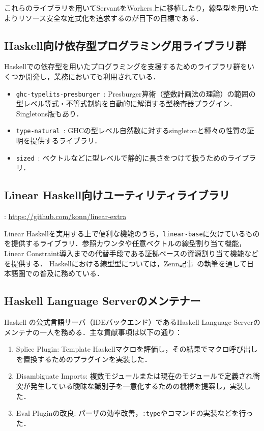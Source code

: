 \documentclass[a4j]{ltjsarticle}
\renewcommand{\emph}[1]{\textbf{\textgt{#1}}}
\begin{document}
\begin{refsection}
これらのライブラリを用いてServantをWorkers上に移植したり，線型型を用いたよりリソース安全な定式化を追求するのが目下の目標である．

\subsection*{Haskell向け依存型プログラミング用ライブラリ群}
Haskellでの依存型を用いたプログラミングを支援するためのライブラリ群をいくつか開発し，業務においても利用されている．

\begin{itemize}
  \item \texttt{ghc-typelits-presburger}~\cite{ghc-typelits-presburger}: Presburger算術（整数計画法の理論）の範囲の型レベル等式・不等式制約を自動的に解消する型検査器プラグイン．Singletons版もあり．
  \item \texttt{type-natural}~\cite{type-natural}: GHCの型レベル自然数に対するsingletonと種々の性質の証明を提供するライブラリ．
  \item \texttt{sized}~\cite{sized}: ベクトルなどに型レベルで静的に長さをつけて扱うためのライブラリ．
\end{itemize}

\subsection*{Linear Haskell向けユーティリティライブラリ}
\vspace{-1em}
\noindent
\emph{URL}: \url{https://github.com/konn/linear-extra}
\vspace{1em}

Linear Haskellを実用する上で便利な機能のうち，\texttt{linear-base}に欠けているものを提供するライブラリ．参照カウンタや任意ベクトルの線型割り当て機能，Linear Constraint導入までの代替手段である証拠ベースの資源割り当て機能などを提供する．
Haskellにおける線型型については，Zenn記事~\cite{ISHII:2023lh1,ISHII:2023lh2}の執筆を通して日本語圏での普及に務めている．

\subsection*{Haskell Language Serverのメンテナー}
Haskell の公式言語サーバ（IDEバックエンド）であるHaskell Language Serverのメンテナの一人を務める．主な貢献事項は以下の通り：
  \begin{enumerate}
    \item Splice Plugin: Template Haskellマクロを評価し，その結果でマクロ呼び出しを置換するためのプラグインを実装した．
    \item Disambiguate Imports: 複数モジュールまたは現在のモジュールで定義され衝突が発生している曖昧な識別子を一意化するための機構を提案し，実装した．
    \item Eval Pluginの改良: パーザの効率改善，\texttt{:type}やコマンドの実装などを行った．
  \end{enumerate}


\end{refsection}
\end{document}
